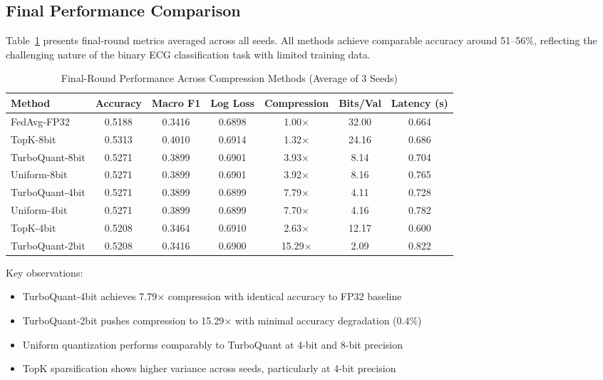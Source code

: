 \documentclass[10pt,conference]{IEEEtran}
\begin{document}
\subsection{Final Performance Comparison}
Table~\ref{tab:main_results} presents final-round metrics averaged across all seeds. All methods achieve comparable accuracy around 51--56\%, reflecting the challenging nature of the binary ECG classification task with limited training data.

\begin{table}[h]
\centering
\caption{Final-Round Performance Across Compression Methods (Average of 3 Seeds)}
\label{tab:main_results}
\begin{tabular}{lcccccc}
\toprule
\textbf{Method} & \textbf{Accuracy} & \textbf{Macro F1} & \textbf{Log Loss} & \textbf{Compression} & \textbf{Bits/Val} & \textbf{Latency (s)} \\
\midrule
FedAvg-FP32 & 0.5188 & 0.3416 & 0.6898 & 1.00$\times$ & 32.00 & 0.664 \\
TopK-8bit & 0.5313 & 0.4010 & 0.6914 & 1.32$\times$ & 24.16 & 0.686 \\
TurboQuant-8bit & 0.5271 & 0.3899 & 0.6901 & 3.93$\times$ & 8.14 & 0.704 \\
Uniform-8bit & 0.5271 & 0.3899 & 0.6901 & 3.92$\times$ & 8.16 & 0.765 \\
TurboQuant-4bit & 0.5271 & 0.3899 & 0.6899 & 7.79$\times$ & 4.11 & 0.728 \\
Uniform-4bit & 0.5271 & 0.3899 & 0.6899 & 7.70$\times$ & 4.16 & 0.782 \\
TopK-4bit & 0.5208 & 0.3464 & 0.6910 & 2.63$\times$ & 12.17 & 0.600 \\
TurboQuant-2bit & 0.5208 & 0.3416 & 0.6900 & 15.29$\times$ & 2.09 & 0.822 \\
\bottomrule
\end{tabular}
\end{table}

Key observations:
\begin{itemize}
    \item TurboQuant-4bit achieves 7.79$\times$ compression with identical accuracy to FP32 baseline
    \item TurboQuant-2bit pushes compression to 15.29$\times$ with minimal accuracy degradation (0.4\%)
    \item Uniform quantization performs comparably to TurboQuant at 4-bit and 8-bit precision
    \item TopK sparsification shows higher variance across seeds, particularly at 4-bit precision
\end{itemize}
\end{document}
